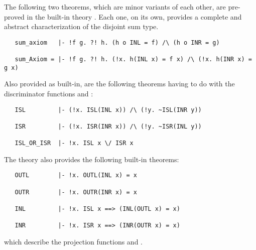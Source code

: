 The following two theorems, which are minor variants of each other, are
pre-proved in the built-in theory . Each one, on its own, provides a
complete and abstract characterization of the disjoint sum type.

\begin{hol}
\begin{verbatim}
   sum_axiom   |- !f g. ?! h. (h o INL = f) /\ (h o INR = g)

   sum_Axiom = |- !f g. ?! h. (!x. h(INL x) = f x) /\ (!x. h(INR x) = g x)
\end{verbatim}\end{hol}

\noindent Also provided as built-in, are the following theorems having to
do with the discriminator functions  and :

\begin{hol}
\begin{verbatim}
   ISL         |- (!x. ISL(INL x)) /\ (!y. ~ISL(INR y))

   ISR         |- (!x. ISR(INR x)) /\ (!y. ~ISR(INL y))

   ISL_OR_ISR  |- !x. ISL x \/ ISR x
\end{verbatim}\end{hol}

\noindent The  theory also provides the following built-in theorems:

\begin{hol}
\begin{verbatim}
   OUTL        |- !x. OUTL(INL x) = x

   OUTR        |- !x. OUTR(INR x) = x

   INL         |- !x. ISL x ==> (INL(OUTL x) = x)

   INR         |- !x. ISR x ==> (INR(OUTR x) = x)
\end{verbatim}\end{hol}

\noindent which describe the projection functions  and .

